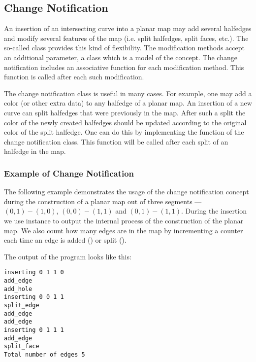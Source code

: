 \begin{ccAdvanced}
\subsection{Change Notification}
  
An insertion of an intersecting curve into a planar map may add
several halfedges and modify several features of the map (i.e.
split halfedges, split faces, etc.). The so-called  class provides this kind of flexibility. The modification 
methods accept an additional parameter, a class which is a model of the
 concept. The
change notification includes an associative function for each
modification method.  This function is called after each such
modification.

The change notification class is useful in many cases. For example,
one may add a color (or other extra data) to any halfedge of a
planar map. An insertion of a new curve can split halfedges that
were previously in the map. After such a split the color of the
newly created halfedges should be updated according to the original
color of the split halfedge. One can do this by implementing the
 function of the change notification class. This
function will be called after each split of an halfedge in the map.

\subsubsection{Example of Change Notification}
\label{ssecn:example2}
The following example demonstrates the usage of the change
notification concept during the construction of a
planar map out of three segments --- $(0,1)-(1,0)$, $(0,0)-(1,1)$
and $(0,1)-(1,1)$.
During the insertion we use  instance to
output the internal process of the construction of the planar map.
We also count how many edges are in the map by incrementing a
counter each time an edge is added () or split 
().


The output of the program looks like this:
\begin{verbatim}
inserting 0 1 1 0
add_edge
add_hole
inserting 0 0 1 1
split_edge
add_edge
add_edge
inserting 0 1 1 1
add_edge
split_face
Total number of edges 5
\end{verbatim}

\end{ccAdvanced}


